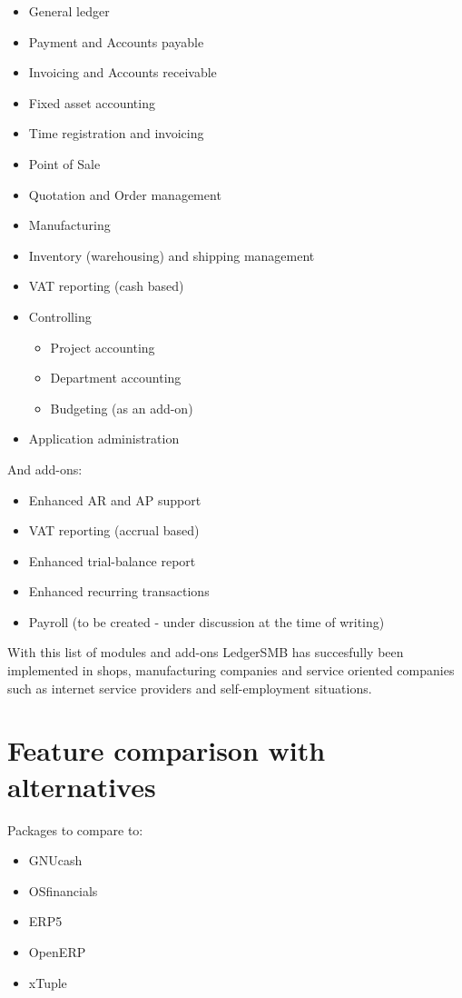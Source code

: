 \begin{itemize}
\item General ledger
\item Payment and Accounts payable
\item Invoicing and Accounts receivable
\item Fixed asset accounting
\item Time registration and invoicing
\item Point of Sale
\item Quotation and Order management
\item Manufacturing
\item Inventory (warehousing) and shipping management
\item VAT reporting (cash based)
\item Controlling
\begin{itemize}
\item Project accounting
\item Department accounting
\item Budgeting (as an add-on)
\end{itemize}
\item Application administration
\end{itemize}

And add-ons:
\begin{itemize}
\item Enhanced AR and AP support
\item VAT reporting (accrual based)
\item Enhanced trial-balance report
\item Enhanced recurring transactions
\item Payroll (to be created - under discussion at the time of writing)
\end{itemize}

With this list of modules and add-ons LedgerSMB has succesfully been implemented
in shops, manufacturing companies and service oriented companies such as internet
service providers and self-employment situations.

\section{Feature comparison with alternatives}

Packages to compare to:

\begin{itemize}
\item GNUcash
\item OSfinancials
\item ERP5
\item OpenERP
\item xTuple
\end{itemize}

